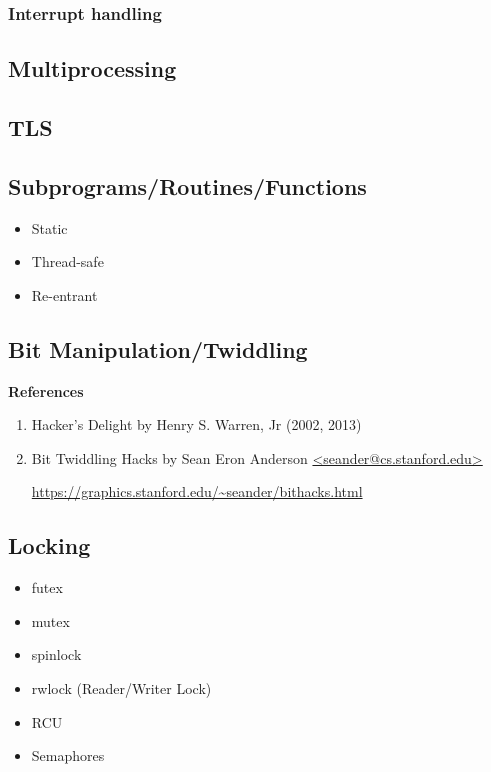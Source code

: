 \documentclass[12pt,a4paper]{article}
\begin{document}
\subsubsection{Interrupt handling}

\subsection{Multiprocessing}

\subsection{TLS}

\subsection{Subprograms/Routines/Functions}

\begin{itemize}
\item Static
\item Thread-safe
\item Re-entrant
\end{itemize}

\subsection{Bit Manipulation/Twiddling}

\textbf{References}

\begin{enumerate}
\item Hacker's Delight by Henry S. Warren, Jr (2002, 2013)

\item Bit Twiddling Hacks by Sean Eron Anderson \url{<seander@cs.stanford.edu>}

    \small
    \url{https://graphics.stanford.edu/~seander/bithacks.html}

\end{enumerate}

\subsection{Locking}

\begin{itemize}
\item futex
\item mutex
\item spinlock
\item rwlock (Reader/Writer Lock)
\item RCU
\item Semaphores
\end{itemize}
\end{document}
